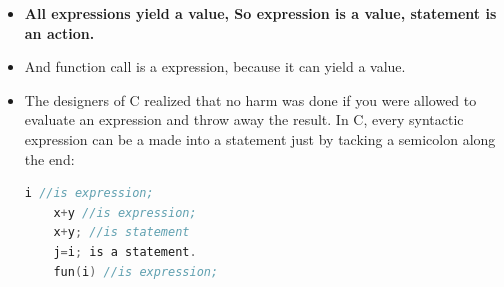 \documentclass[a4paper,12pt,twoside]{book}
\begin{document}
\begin{itemize}
    \item \textbf{All expressions yield a value, So expression is a value, statement is an action.}
    
    \item And function call is a expression, because it can yield a value.
    
    \item The designers of C realized that no harm was done if you were allowed to evaluate an expression and throw away the result. In C, every syntactic expression can be a made into a statement just by tacking a semicolon along the end:
    
    \begin{lstlisting}[frame=single, language=c++]
    i //is expression;
    x+y //is expression;
    x+y; //is statement
    j=i; is a statement.
    fun(i) //is expression;
    \end{lstlisting}
    
\end{itemize}
\end{document}

